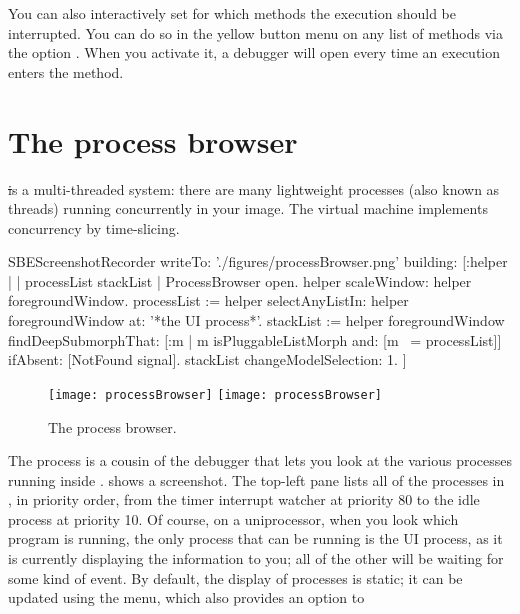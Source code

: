\documentclass[a4paper,10pt,twoside]{book}
\begin{document}
You can also interactively set for which methods the execution should be interrupted.
You can do so in the yellow button menu on any list of methods via the option .
When you activate it, a debugger will open every time an execution enters the method.



\section{The process browser}
\label{process-browser}

\st is a multi-threaded system: there are many lightweight processes (also known as threads) running concurrently in your image.
The \sq virtual machine implements concurrency by time-slicing.

\begin{ExecuteSmalltalkScript}
SBEScreenshotRecorder writeTo: './figures/processBrowser.png' building: [:helper |
	| processList stackList |
	ProcessBrowser open.
	helper scaleWindow: helper foregroundWindow.
	processList := helper selectAnyListIn: helper foregroundWindow at: '*the UI process*'.
	stackList := helper foregroundWindow findDeepSubmorphThat: [:m | m isPluggableListMorph and: [m ~= processList]] ifAbsent: [NotFound signal].
	stackList changeModelSelection: 1.
]
\end{ExecuteSmalltalkScript}
\begin{figure}[btp]
	\begin{center}
	\ifluluelse
		{\texttt{[image: processBrowser]}}
		{\texttt{[image: processBrowser]}}
	\end{center}
	\caption{The process browser.}
	\label{fig:processBrowser}
\end{figure}

The process  is a cousin of the debugger that lets you look at the various processes running inside \sq.
 shows a screenshot.
The top-left pane lists all of the processes in \sq, in priority order, from the timer interrupt watcher at priority 80 to the idle process at priority 10.
Of course, on a uniprocessor, when you look which program is running, the only process that can be running is the UI process, as it is currently displaying the information to you; all of the other will be waiting for some kind of event.
By default, the display of processes is static; it can be updated using the  menu, which also provides an option to 
\end{document}
